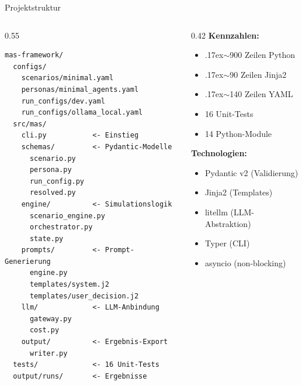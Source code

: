 \documentclass[aspectratio=169, 12pt]{beamer}
\begin{document}
\begin{frame}[fragile]{Projektstruktur}

\begin{columns}[T]
\begin{column}{0.55\textwidth}
\begin{lstlisting}[language={}, basicstyle=\ttfamily\tiny]
mas-framework/
  configs/
    scenarios/minimal.yaml
    personas/minimal_agents.yaml
    run_configs/dev.yaml
    run_configs/ollama_local.yaml
  src/mas/
    cli.py           <- Einstieg
    schemas/         <- Pydantic-Modelle
      scenario.py
      persona.py
      run_config.py
      resolved.py
    engine/          <- Simulationslogik
      scenario_engine.py
      orchestrator.py
      state.py
    prompts/         <- Prompt-Generierung
      engine.py
      templates/system.j2
      templates/user_decision.j2
    llm/             <- LLM-Anbindung
      gateway.py
      cost.py
    output/          <- Ergebnis-Export
      writer.py
  tests/             <- 16 Unit-Tests
  output/runs/       <- Ergebnisse
\end{lstlisting}
\end{column}

\begin{column}{0.42\textwidth}
\small
\textbf{Kennzahlen:}
\begin{itemize}
    \item {\raise.17ex\hbox{$\scriptstyle\sim$}}900 Zeilen Python
    \item {\raise.17ex\hbox{$\scriptstyle\sim$}}90 Zeilen Jinja2
    \item {\raise.17ex\hbox{$\scriptstyle\sim$}}140 Zeilen YAML
    \item 16 Unit-Tests
    \item 14 Python-Module
\end{itemize}

\vspace{0.4cm}
\textbf{Technologien:}
\begin{itemize}
    \item Pydantic v2 (Validierung)
    \item Jinja2 (Templates)
    \item litellm (LLM-Abstraktion)
    \item Typer (CLI)
    \item asyncio (non-blocking)
\end{itemize}
\end{column}
\end{columns}

\end{frame}
\end{document}
